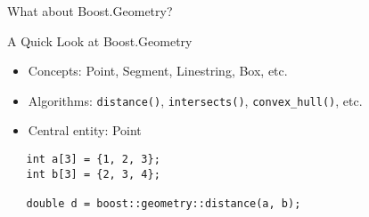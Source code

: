 


\begin{frame}[fragile]{What about Boost.Geometry?}
 \begin{block}{A Quick Look at Boost.Geometry}
  \begin{itemize}
   \item Concepts: Point, Segment, Linestring, Box, etc.
   \item Algorithms: \lstinline|distance()|, \lstinline|intersects()|, \lstinline|convex_hull()|, etc.
   \item Central entity: Point
  \end{itemize}
  \begin{lstlisting}
   int a[3] = {1, 2, 3};
   int b[3] = {2, 3, 4};

   double d = boost::geometry::distance(a, b);
  \end{lstlisting}  
 \end{block}

\end{frame}



